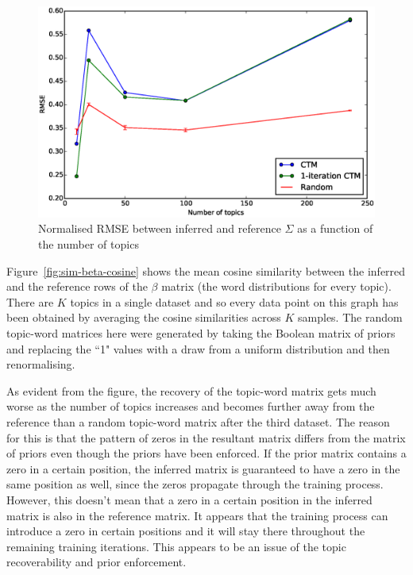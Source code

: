 \documentclass[12pt,a4paper,twoside,openright]{report}
\begin{document}
\begin{figure}[!htb]
\includegraphics[width=\textwidth]{sim-sigma-rmse.eps}
\caption{Normalised RMSE between inferred and reference $\Sigma$ as a function of the number of topics}
\label{fig:sim-sigma-rmse}
\end{figure}

Figure~\ref{fig:sim-beta-cosine} shows the mean cosine similarity between the inferred and the reference rows of the $\beta$ matrix (the word distributions for every topic). There are $K$ topics in a single dataset and so every data point on this graph has been obtained by averaging the cosine similarities across $K$ samples. The random topic-word matrices here were generated by taking the Boolean matrix of priors and replacing the ``1" values with a draw from a uniform distribution and then renormalising.

As evident from the figure, the recovery of the topic-word matrix gets much worse as the number of topics increases and becomes further away from the reference than a random topic-word matrix after the third dataset. The reason for this is that the pattern of zeros in the resultant matrix differs from the matrix of priors even though the priors have been enforced. If the prior matrix contains a zero in a certain position, the inferred matrix is guaranteed to have a zero in the same position as well, since the zeros propagate through the training process. However, this doesn't mean that a zero in a certain position in the inferred matrix is also in the reference matrix. It appears that the training process can introduce a zero in certain positions and it will stay there throughout the remaining training iterations. This appears to be an issue of the topic recoverability and prior enforcement.
\end{document}
